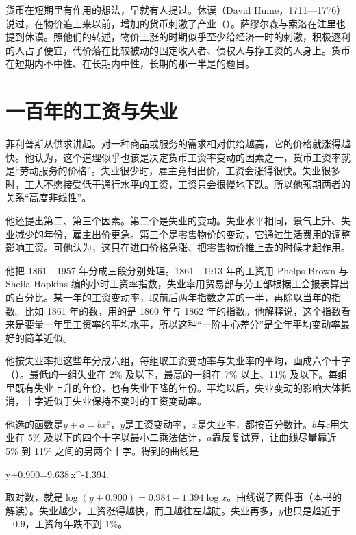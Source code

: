 货币在短期里有作用的想法，早就有人提过。休谟（David Hume，1711—1776）\cite{loc38}说过，在物价追上来以前，增加的货币刺激了产业（）。萨缪尔森与索洛在注里也提到休谟\cite{samuelson1960}。照他们的转述，物价上涨的时期似乎至少给经济一时的刺激，积极逐利的人占了便宜，代价落在比较被动的固定收入者、债权人与挣工资的人身上\cite{samuelson1960}。货币在短期内不中性、在长期内中性，长期的那一半是的题目。

\section{一百年的工资与失业}\label{sec:phillips-curve}

菲利普斯从供求讲起。对一种商品或服务的需求相对供给越高，它的价格就涨得越快。他认为，这个道理似乎也该是决定货币工资率变动的因素之一，货币工资率就是“劳动服务的价格”\cite{phillips1958}。失业很少时，雇主竞相出价，工资会涨得很快。失业很多时，工人不愿接受低于通行水平的工资，工资只会很慢地下跌\cite{phillips1958}。所以他预期两者的关系“高度非线性”\cite{phillips1958}。

他还提出第二、第三个因素\cite{phillips1958}。第二个是失业的变动。失业水平相同，景气上升、失业减少的年份，雇主出价更急\cite{phillips1958}。第三个是零售物价的变动，它通过生活费用的调整影响工资。可他认为，这只在进口价格急涨、把零售物价推上去的时候才起作用\cite{phillips1958}。

他把 1861—1957 年分成三段分别处理\cite{phillips1958}。1861—1913 年的工资用 Phelps Brown 与 Sheila Hopkins 编的小时工资率指数，失业率用贸易部与劳工部根据工会报表算出的百分比\cite{phillips1958}。某一年的工资变动率，取前后两年指数之差的一半，再除以当年的指数\cite{phillips1958}。比如 1861 年的数，用的是 1860 年与 1862 年的指数\cite{phillips1958}。他解释说，这个指数看来是要量一年里工资率的平均水平，所以这种“一阶中心差分”是全年平均变动率最好的简单近似\cite{phillips1958}。

他按失业率把这些年分成六组，每组取工资变动率与失业率的平均，画成六个十字（）\cite{phillips1958}。最低的一组失业在 2\% 及以下，最高的一组在 7\% 以上、11\% 及以下\cite{phillips1958}。每组里既有失业上升的年份，也有失业下降的年份。平均以后，失业变动的影响大体抵消，十字近似于失业保持不变时的工资变动率\cite{phillips1958}。

他选的函数是$y+a=bx^{c}$，$y$是工资变动率，$x$是失业率，都按百分数计\cite{phillips1958}。$b$与$c$用失业在 5\% 及以下的四个十字以最小二乘法估计，$a$靠反复试算，让曲线尽量靠近 5\% 到 11\% 之间的另两个十字\cite{phillips1958}。得到的曲线是
\begin{keyeq}
y+0.900=9.638\,x^{-1.394}.\label{eq:phillips-curve}
\end{keyeq}
取对数，就是$\log(y+0.900)=0.984-1.394\log x$\cite{phillips1958}。曲线说了两件事（本书的解读）。失业越少，工资涨得越快，而且越往左越陡。失业再多，$y$也只是趋近于$-0.9$，工资每年跌不到 1\%。

